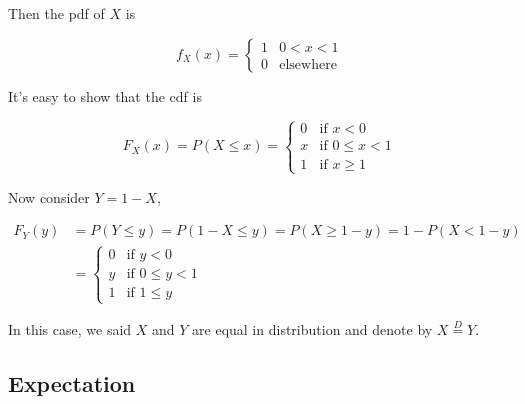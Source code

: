 \documentclass{article}
\begin{document}
            Then the pdf of $ X $ is

            \begin{equation*}
                 f_{X}(x) =  \left\{
                     \begin{array}{ll}
                         1 & 0 < x < 1 \\
                         0 & \text{elsewhere}
                     \end{array}
                 \right.
            \end{equation*}

            It's easy to show that the cdf is

            \begin{equation*}
                F_{X}(x) = P ( X \leq x ) = \left\{
                     \begin{array}{ll}
                         0 & \text{if } x < 0 \\
                         x & \text{if } 0 \leq x < 1 \\
                         1 & \text{if } x \geq 1
                     \end{array}
                 \right.
            \end{equation*}

            Now consider $ Y = 1 - X $,

            \begin{align*}
                F_{Y}(y) &= P(Y \leq y) = P(1 -X \leq y) = P(X \geq 1 - y) = 1 - P(X < 1 - y) \\
                         &=  \left\{
                             \begin{array}{ll}
                                 0 & \text{if } y < 0        \\
                                 y & \text{if } 0 \leq y < 1 \\
                                 1 & \text{if } 1 \leq y
                             \end{array}
                         \right.
            \end{align*}

            In this case, we said $ X $ and $ Y $ are equal in distribution and
            denote by $ X \stackrel{D}{=} Y $.


        \subsection{Expectation}
\end{document}
